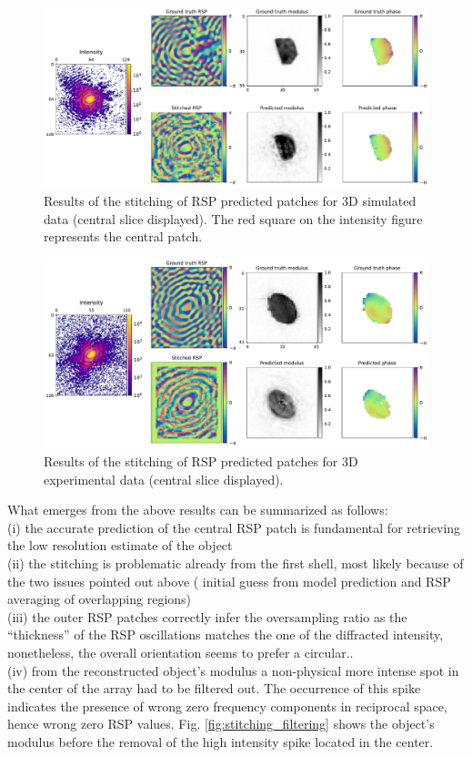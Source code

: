 \begin{figure}[H]
    \centering
    \includegraphics[width=\textwidth]{figures/Phasing/stitching_low_strain_sim.pdf}
    \caption{Results of the stitching of RSP predicted patches for 3D simulated data (central slice displayed). The red 
    square on the intensity figure represents the central patch.}
    \label{fig:stitching_sim_low}
\end{figure}

\begin{figure}[H]
    \centering
    \includegraphics[width=\textwidth]{figures/Phasing/stitching_low_strain_exp.pdf}
    \caption{Results of the stitching of RSP predicted patches for 3D experimental data (central slice displayed).}
    \label{fig:stitching_exp_low}
\end{figure}

What emerges from the above results can be summarized as follows: \\
(i) the accurate prediction of the central RSP patch is fundamental for retrieving the low resolution estimate of the object \\
(ii) the stitching is problematic already from the first shell, most likely because of the two issues pointed out above (
    initial guess from model prediction and RSP averaging of overlapping regions)\\
(iii) the outer RSP patches correctly infer the oversampling ratio as the ``thickness'' of the RSP oscillations matches 
the one of the diffracted intensity, nonetheless, the overall orientation seems to prefer a circular.. \\
(iv) from the reconstructed object's modulus a non-physical more intense spot in the center of the array had to be
filtered out. The occurrence of this spike indicates the presence of wrong zero frequency components in reciprocal
space, hence wrong zero RSP values. Fig. \ref{fig:stitching_filtering} shows the object's modulus before the removal of 
the high intensity spike located in the center. 

